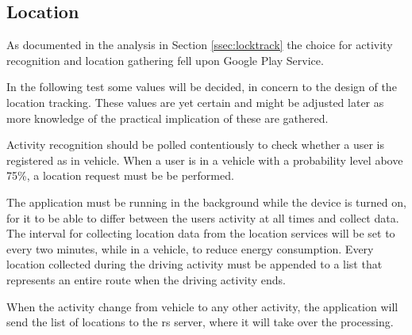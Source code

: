 \subsection{Location}
As documented in the analysis in Section \ref{ssec:locktrack} the choice for activity recognition and location gathering fell upon Google Play Service.

In the following test some values will be decided, in concern to the design of the location tracking. 
These values are yet certain and might be adjusted later as more knowledge of the practical implication of these are gathered. 


Activity recognition should be polled contentiously to check whether a user is registered as in vehicle.
When a user is in a vehicle with a probability level above 75\%, a location request must be be performed.

The application must be running in the background while the device is turned on, for it to be able to differ between the users activity at all times and collect data. 
The interval for collecting location data from the location services will be set to every two minutes, while in a vehicle, to reduce energy consumption. 
Every location collected during the driving activity must be appended to a list that represents an entire route when the driving activity ends.

When the activity change from vehicle to any other activity, the application will send the list of locations to the \gls{rs} server, where it will take over the processing. 